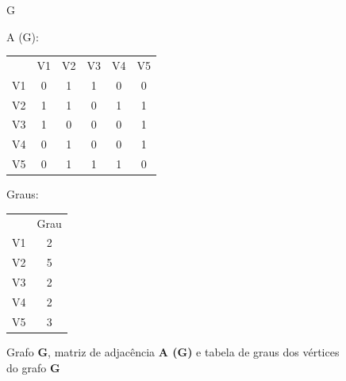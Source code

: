 \documentclass[a4paper, 12pt]{article}
\begin{document}
    \begin{figure}[hbt!]
        \begin{multicols}{2}
            \begin{center}
            G
            \end{center}
        
            A (G):
            \begin{tabular}{cccccc}
                & V1 & V2 & V3 & V4 & V5 \\
                V1 & 0  & 1  & 1  & 0  & 0  \\
                V2 & 1  & 1  & 0  & 1  & 1  \\
                V3 & 1  & 0  & 0  & 0  & 1  \\
                V4 & 0  & 1  & 0  & 0  & 1  \\
                V5 & 0  & 1  & 1  & 1  & 0 
            \end{tabular}
            
            \vspace{0.4in}
            Graus:
            \begin{tabular}{cc}
                & Grau \\
                V1 & 2    \\
                V2 & 5    \\
                V3 & 2    \\
                V4 & 2    \\
                V5 & 3   
            \end{tabular}
        \end{multicols}
        \caption{Grafo \textbf{G}, matriz de adjacência \textbf{A (G)} e tabela de graus dos vértices do grafo \textbf{G}}
    \end{figure}
    
\end{document}
